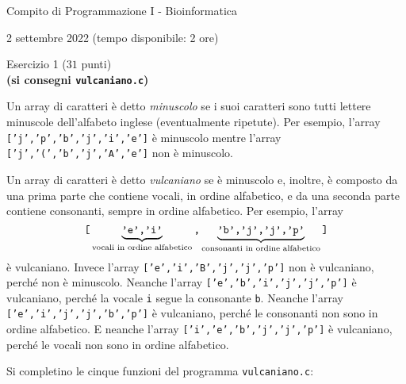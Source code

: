 \documentclass[12pt]{article}
\begin{document}
\begin{center}{\LARGE Compito di Programmazione I - Bioinformatica}\\
\begin{center}
  \large 2 settembre 2022 (tempo disponibile: 2 ore)
\end{center}
\end{center}

\vspace*{1ex}
\begin{center}{\Large Esercizio 1} ($31$ punti)\\
  \textbf{(si consegni \texttt{vulcaniano.c})}
\end{center}

Un array di caratteri \`e detto \emph{minuscolo} se i suoi caratteri
sono tutti lettere minuscole dell'alfabeto inglese (eventualmente ripetute).
Per esempio, l'array \texttt{['j','p','b','j','i','e']} \`e minuscolo
mentre l'array \texttt{['j','(','b','j','A','e']} non \`e minuscolo.

Un array di caratteri \`e detto \emph{vulcaniano} se \`e minuscolo
e, inoltre, \`e composto da una prima parte che contiene
vocali, in ordine alfabetico, e da una seconda parte contiene
consonanti, sempre in ordine alfabetico.
Per esempio, l'array
\[
\mbox{\texttt{[}}\underbrace{\mbox{\texttt{'e','i'}}}_{\text{vocali in ordine alfabetico}}\mbox{\texttt{,}}\underbrace{\mbox{\texttt{'b','j','j','p'}}}_{\text{consonanti in ordine alfabetico}}\mbox{\texttt{]}}
\]
\`e vulcaniano.
Invece l'array \texttt{['e','i','B','j','j','p']} non \`e vulcaniano,
perch\'e non \`e minuscolo.
Neanche l'array \texttt{['e','b','i','j','j','p']} \`e vulcaniano, perch\'e la
vocale \texttt{i} segue la consonante \texttt{b}.
Neanche l'array \texttt{['e','i','j','j','b','p']} \`e vulcaniano, perch\'e
le consonanti non sono in ordine alfabetico.
E neanche l'array \texttt{['i','e','b','j','j','p']} \`e vulcaniano, perch\'e
le vocali non sono in ordine alfabetico.

Si completino le cinque funzioni del programma \texttt{vulcaniano.c}:
\end{document}
